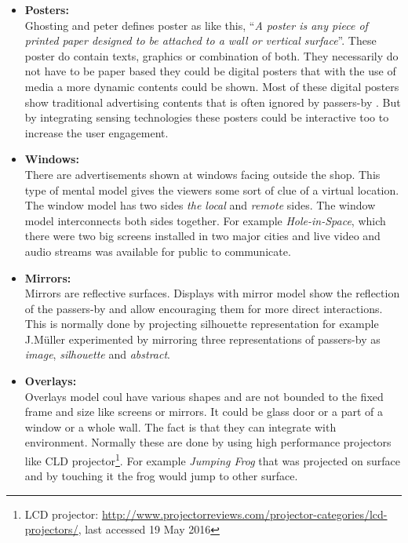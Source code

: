 \begin{itemize}
\item \textbf{Posters: } \\
Ghosting and peter\cite{Poster_Ad} defines poster as like this, ``\emph{A poster is any piece of printed paper designed to be attached to a wall or vertical surface}''. These poster do contain texts, graphics or combination of both. They necessarily do not have to be paper based they could be digital posters that with the use of media a more dynamic contents could be shown. Most of these digital posters show traditional advertising contents that is often ignored by passers-by \cite{display_blindness}. But by integrating sensing technologies these posters could be interactive too to increase the user engagement.


\item \textbf{Windows: } \\
There are advertisements shown at windows facing outside the shop. This type of mental model gives the viewers some sort of clue of a virtual location. The window model has two sides \emph{the local} and \emph{remote} sides. The window model interconnects both sides together. For example \emph{Hole-in-Space}\cite{hole_space}, which there were two big screens installed in two major cities and live video and audio streams was available for public to communicate.

\item \textbf{Mirrors: } \\
Mirrors are reflective surfaces. Displays with mirror model show the reflection of the passers-by and allow encouraging them for more direct interactions. This is normally done by projecting silhouette representation for example J.Müller \cite{LookingGlass} experimented by mirroring three representations of passers-by as \emph{image}, \emph{silhouette} and \emph{abstract}.

\item \textbf{Overlays: } \\
Overlays model coul have various shapes and are not bounded to the fixed frame and size like screens or mirrors. It could be glass door or a part of a window or a whole wall. The fact is that they can integrate with environment. Normally these are done by using high performance projectors like CLD projector\footnote{LCD projector: \url{http://www.projectorreviews.com/projector-categories/lcd-projectors/}, last accessed 19 May 2016}. For example \emph{Jumping Frog} \cite{ meme-tags}that was projected on surface and by touching it the frog would jump to other surface.


\end{itemize}



